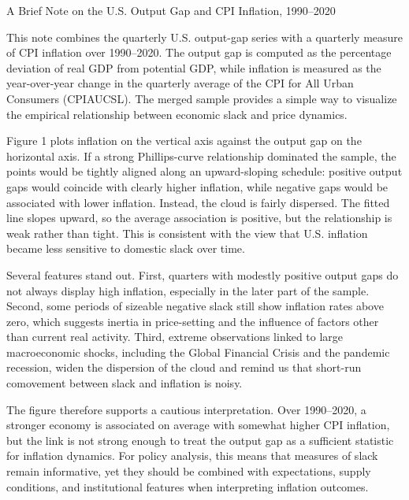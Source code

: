 \documentclass[11pt,a4paper]{article}
\begin{document}
\begin{center}
{\Large A Brief Note on the U.S. Output Gap and CPI Inflation, 1990--2020}
\end{center}

This note combines the quarterly U.S. output-gap series with a quarterly measure of CPI inflation over 1990--2020. The output gap is computed as the percentage deviation of real GDP from potential GDP, while inflation is measured as the year-over-year change in the quarterly average of the CPI for All Urban Consumers (CPIAUCSL). The merged sample provides a simple way to visualize the empirical relationship between economic slack and price dynamics.

Figure 1 plots inflation on the vertical axis against the output gap on the horizontal axis. If a strong Phillips-curve relationship dominated the sample, the points would be tightly aligned along an upward-sloping schedule: positive output gaps would coincide with clearly higher inflation, while negative gaps would be associated with lower inflation. Instead, the cloud is fairly dispersed. The fitted line slopes upward, so the average association is positive, but the relationship is weak rather than tight. This is consistent with the view that U.S. inflation became less sensitive to domestic slack over time.

Several features stand out. First, quarters with modestly positive output gaps do not always display high inflation, especially in the later part of the sample. Second, some periods of sizeable negative slack still show inflation rates above zero, which suggests inertia in price-setting and the influence of factors other than current real activity. Third, extreme observations linked to large macroeconomic shocks, including the Global Financial Crisis and the pandemic recession, widen the dispersion of the cloud and remind us that short-run comovement between slack and inflation is noisy.

The figure therefore supports a cautious interpretation. Over 1990--2020, a stronger economy is associated on average with somewhat higher CPI inflation, but the link is not strong enough to treat the output gap as a sufficient statistic for inflation dynamics. For policy analysis, this means that measures of slack remain informative, yet they should be combined with expectations, supply conditions, and institutional features when interpreting inflation outcomes.
\end{document}

